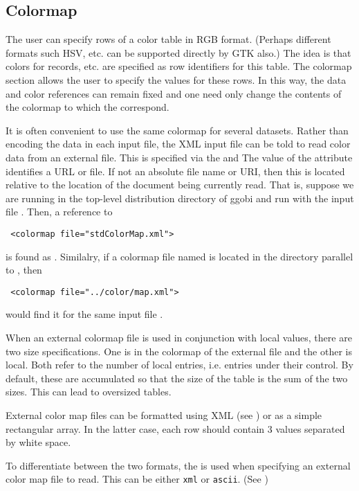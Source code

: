 \documentclass{article}
\begin{document}
\subsection{Colormap}
The user can specify rows of a color table in RGB format.  (Perhaps
different formats such HSV, etc. can be supported directly by GTK
also.)  The idea is that colors for records, etc.  are specified as
row identifiers for this table.  The colormap section allows the user
to specify the values for these rows.  In this way, the data and color
references can remain fixed and one need only change the contents of
the colormap to which the correspond.

It is often convenient to use the same colormap for several
datasets. Rather than encoding the data in each input file, the XML
input file can be told to read color data from an external file.  This
is specified via the  and  The
value of the  attribute identifies a URL or
file. If not an absolute file name or URI, then this is located
relative to the location of the document being currently read.
That is, suppose we are running in the top-level distribution
directory of ggobi and run with the input file .
Then, a reference to 
\begin{verbatim}
 <colormap file="stdColorMap.xml">
\end{verbatim}
is found as .
Similalry, if a colormap file named  is located
in the directory  parallel to ,
then
\begin{verbatim}
 <colormap file="../color/map.xml">
\end{verbatim}
would find it for the same input file .

When an external colormap file is used in conjunction with local
values, there are two size specifications.  One is in the colormap of
the external file and the other is local. Both refer to the number of
local entries, i.e. entries under their control.  By default, these
are accumulated so that the size of the table is the sum of the two
sizes.  This can lead to oversized tables.






External color map files can be formatted using XML (see
) or as a simple rectangular array.  In the
latter case, each row should contain 3 values separated by white
space.


To differentiate between the two formats, the  is
used when specifying an external color map file to read.  This can be
either \texttt{xml} or \texttt{ascii}.  (See )
\end{document}
